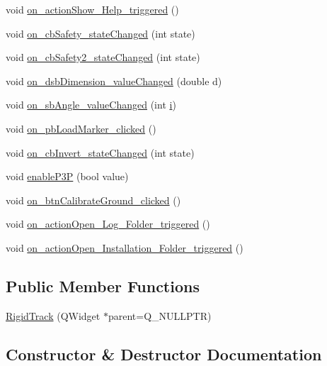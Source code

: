 \begin{DoxyCompactItemize}
void \hyperlink{class_rigid_track_af14465ac3ad6957b939c63cbae2d7d8c}{on\+\_\+action\+Show\+\_\+\+Help\+\_\+triggered} ()
\item 
void \hyperlink{class_rigid_track_a8f999fa968f4cc9fa548bdc8438b32c4}{on\+\_\+cb\+Safety\+\_\+state\+Changed} (int state)
\item 
void \hyperlink{class_rigid_track_ad6ba1cfe25f18ff0d9f5993aafa36d16}{on\+\_\+cb\+Safety2\+\_\+state\+Changed} (int state)
\item 
void \hyperlink{class_rigid_track_ae5e44de9f4e3cacdd647c0305936b02b}{on\+\_\+dsb\+Dimension\+\_\+value\+Changed} (double d)
\item 
void \hyperlink{class_rigid_track_a217ca3d828c99943ea155e6891264b24}{on\+\_\+sb\+Angle\+\_\+value\+Changed} (int \hyperlink{simpleplot_8m_a81b94ba50b782836960e54bcfa99fc88}{i})
\item 
void \hyperlink{class_rigid_track_ad3e07592fbc1491cdc36dd5e817e1775}{on\+\_\+pb\+Load\+Marker\+\_\+clicked} ()
\item 
void \hyperlink{class_rigid_track_ab347b3edeca55685f4d601549596d44a}{on\+\_\+cb\+Invert\+\_\+state\+Changed} (int state)
\item 
void \hyperlink{class_rigid_track_a39aba14e1c846cb3f1773d9145cf96e1}{enable\+P3P} (bool value)
\item 
void \hyperlink{class_rigid_track_a9a939d6db3d268e75a603cb3d492a91b}{on\+\_\+btn\+Calibrate\+Ground\+\_\+clicked} ()
\item 
void \hyperlink{class_rigid_track_a63a85d33ef48741b0e671ebbbd43083a}{on\+\_\+action\+Open\+\_\+\+Log\+\_\+\+Folder\+\_\+triggered} ()
\item 
void \hyperlink{class_rigid_track_a7d858fcf6c9fe852ee3facfe6588aec1}{on\+\_\+action\+Open\+\_\+\+Installation\+\_\+\+Folder\+\_\+triggered} ()
\end{DoxyCompactItemize}
\subsection*{Public Member Functions}
\begin{DoxyCompactItemize}
\item 
\hyperlink{class_rigid_track_abd3d529ea29b1050439c97c5a5aa8c4b}{Rigid\+Track} (Q\+Widget $\ast$parent=Q\+\_\+\+N\+U\+L\+L\+P\+TR)
\end{DoxyCompactItemize}


\subsection{Constructor \& Destructor Documentation}
\mbox{\label{class_rigid_track_abd3d529ea29b1050439c97c5a5aa8c4b}} 
